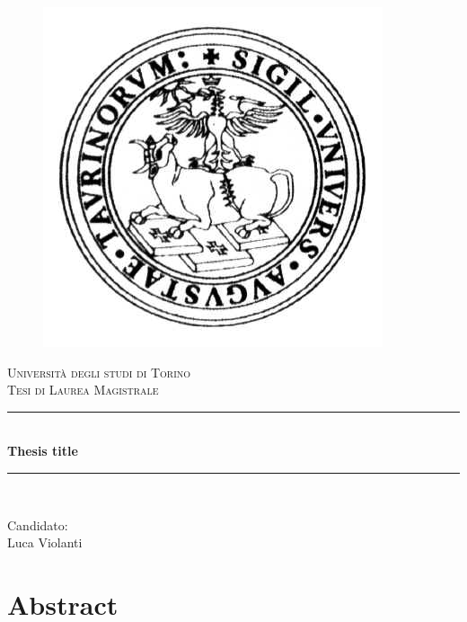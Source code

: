 \documentclass[a4paper, 11pt, oneside]{elsarticle}
\newcommand{\HRule}{\rule{\linewidth}{0.5mm}}
\begin{document}
\begin{titlepage}
\begin{center}

\begin{figure}[htp]
\centering
\includegraphics[scale=0.25]{img/logo_unito.png}
\label{}
\end{figure}

\textsc{\LARGE Università degli studi di Torino}\\[2cm]
\textsc{\Large Tesi di Laurea Magistrale}\\[2cm]

\HRule \\[0.4cm]
{ \huge \bfseries Thesis title}\\[0.2cm]
\HRule \\[3cm]

\begin{flushleft}
{\Large
Candidato:\\[0.5cm]
Luca Violanti}
\end{flushleft}

\end{center}
\end{titlepage}
\newpage



\section*{Abstract}
\end{document}
